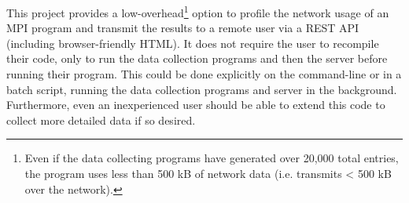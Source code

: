 
This project provides a low-overhead\footnote{Even if the data collecting programs have generated over 20,000 total entries, the program uses less than 500 kB of network data (i.e. transmits < 500 kB over the network).} option to profile the network usage of an MPI program and transmit the results to a remote user via a REST API (including browser-friendly HTML). It does not require the user to recompile their code, only to run the data collection programs and then the server before running their program. This could be done explicitly on the command-line or in a batch script, running the data collection programs and server in the background. Furthermore, even an inexperienced user should be able to extend this code to collect more detailed data if so desired.
